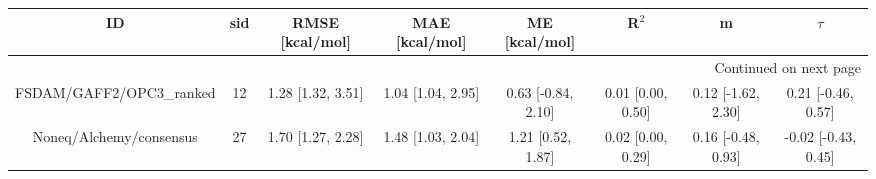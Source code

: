 \documentclass[8pt]{article}
\begin{document}
\begin{center}
\begin{footnotesize}
\begin{longtable}{|cccccccc|}
\toprule
                       ID & sid &    RMSE [kcal/mol] &     MAE [kcal/mol] &       ME [kcal/mol] &              R$^2$ &                   m &               $\tau$ \\
\midrule
\endhead
\midrule
\multicolumn{8}{r}{{Continued on next page}} \\
\midrule
\endfoot

\bottomrule
\endlastfoot
 FSDAM/GAFF2/OPC3\_ranked &  12 &  1.28 [1.32, 3.51] &  1.04 [1.04, 2.95] &  0.63 [-0.84, 2.10] &  0.01 [0.00, 0.50] &  0.12 [-1.62, 2.30] &   0.21 [-0.46, 0.57] \\
  Noneq/Alchemy/consensus &  27 &  1.70 [1.27, 2.28] &  1.48 [1.03, 2.04] &   1.21 [0.52, 1.87] &  0.02 [0.00, 0.29] &  0.16 [-0.48, 0.93] &  -0.02 [-0.43, 0.45] \\
\end{longtable}
\end{footnotesize}
\end{center}
\end{document}
